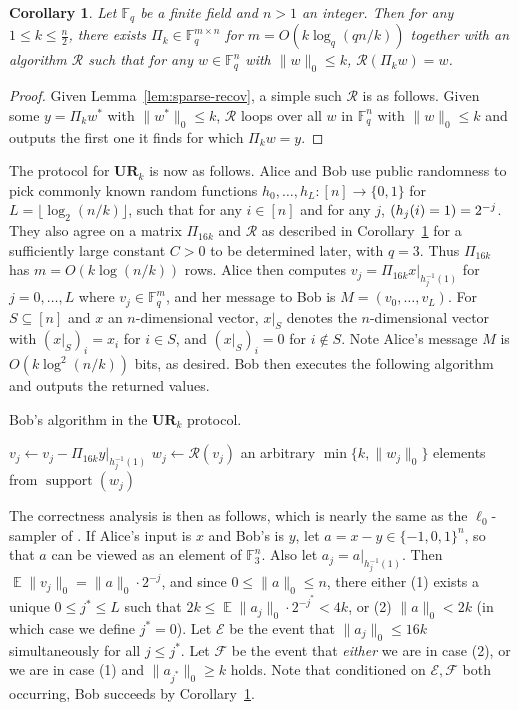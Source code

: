 \documentclass[11pt]{article}
\newcommand{\supp}{\mathop{support}}
\newtheorem{corollary}{Corollary}
\DeclareMathOperator*{\E}{\mathbb{E}}
\let\Pr\relax
\DeclareMathOperator*{\Pr}{\mathbb{P}}
\newcommand{\F}{\mathbb{F}}
\newcommand{\ur}{\mathbf{UR}\xspace}
\begin{document}
\begin{corollary}\label{cor:ksparse}
Let $\F_q$ be a finite field and $n>1$ an integer. Then for any $1\le k\le \frac n2$, there exists $\Pi_k\in \F_q^{m\times n}$ for $m = O(k\log_q(qn/k))$ together with an algorithm $\mathcal{R}$ such that for any $w\in\F_q^n$ with $\|w\|_0 \le k$, $\mathcal{R}(\Pi_k w) = w$.
\end{corollary}
\begin{proof}
Given Lemma~\ref{lem:sparse-recov}, a simple such $\mathcal{R}$ is as follows. Given some $y = \Pi_k w^*$ with $\|w^*\|_0 \le k$, $\mathcal{R}$ loops over all $w$ in $\F_q^n$ with $\|w\|_0 \le k$ and outputs the first one it finds for which $\Pi_k w = y$.
\end{proof}

The protocol for $\ur_k$ is now as follows. Alice and Bob use public randomness to pick commonly known random functions $h_0,\ldots,h_L:[n]\rightarrow\{0,1\}$ for $L = \lfloor\log_2(n/k)\rfloor$, such that for any $i\in[n]$ and for any $j$, $\Pr(h_j(i) = 1) = 2^{-j}$. They also agree on a matrix $\Pi_{16k}$ and $\mathcal{R}$ as described in Corollary~\ref{cor:ksparse} for a sufficiently large constant $C>0$ to be determined later, with $q = 3$. Thus $\Pi_{16k}$ has $m = O(k\log(n/k))$ rows. Alice then computes $v_j = \Pi_{16k} x|_{h_j^{-1}(1)}$ for $j=0,\ldots,L$ where $v_j\in\F_q^m$, and her message to Bob is $M = (v_0,\ldots,v_L)$. For $S\subseteq [n]$ and $x$ an $n$-dimensional vector, $x|_S$ denotes the $n$-dimensional vector with $(x|_S)_i = x_i$ for $i\in S$, and $(x|_S)_i = 0$ for $i\notin S$. Note Alice's message $M$ is $O(k\log^2(n/k))$ bits, as desired. Bob then executes the following algorithm and outputs the returned values.

\begin{algorithm}[H] 
  \caption{Bob's algorithm in the $\ur_k$ protocol.} \label{algo:bob-protocol}
  \begin{algorithmic}[1]
      \State $v_j \leftarrow v_j - \Pi_{16k} y|_{h_j^{-1}(1)}$
      \State $w_j\leftarrow \mathcal{R}(v_j)$
      \State \Return an arbitrary $\min\{k, \|w_j\|_0\}$ elements from $\supp(w_j)$
      \EndIf
    \EndFor
    \EndProcedure
  \end{algorithmic}
\end{algorithm}

The correctness analysis is then as follows, which is nearly the same as the $\ell_0$-sampler of \cite{JowhariST11}. If Alice's input is $x$ and Bob's is $y$, let $a = x-y \in \{-1,0,1\}^n$, so that $a$ can be viewed as an element of $\F_3^n$. Also let $a_j = a|_{h_j^{-1}(1)}$. Then $\E \|v_j\|_0 = \|a\|_0\cdot 2^{-j}$, and since $0\le \|a\|_0 \le n$, there either (1) exists a unique $0\le j^*\le L$ such that $2k\le \E\|a_j\|_0\cdot 2^{-j^*}< 4k$, or (2) $\|a\|_0 < 2k$ (in which case we define $j^* = 0$). Let $\mathcal{E}$ be the event that $\|a_j\|_0 \le 16k$ simultaneously for all $j\le j^*$. Let $\mathcal{F}$ be the event that {\it either} we are in case (2), or we are in case (1) and $\|a_{j^*}\|_0 \ge k$ holds. Note that conditioned on $\mathcal{E}, \mathcal{F}$ both occurring, Bob succeeds by Corollary~\ref{cor:ksparse}.
\end{document}
